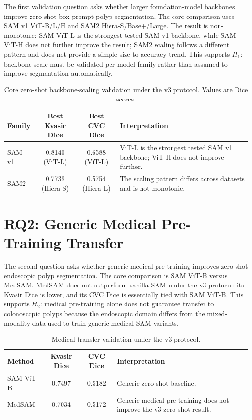 The first validation question asks whether larger foundation-model backbones improve zero-shot box-prompt polyp segmentation. The core comparison uses SAM v1 ViT-B/L/H and SAM2 Hiera-S/Base+/Large. The result is non-monotonic: SAM ViT-L is the strongest tested SAM v1 backbone, while SAM ViT-H does not further improve the result; SAM2 scaling follows a different pattern and does not provide a simple size-to-accuracy trend. This supports $H_1$: backbone scale must be validated per model family rather than assumed to improve segmentation automatically.

\begin{table}[H]
\centering
\caption{Core zero-shot backbone-scaling validation under the v3 protocol. Values are Dice scores.}
\label{tab:rq1-scaling-results}
\begin{tabular}{lccp{5.8cm}}
\toprule
\textbf{Family} & \textbf{Best Kvasir Dice} & \textbf{Best CVC Dice} & \textbf{Interpretation} \\
\midrule
SAM v1 & 0.8140 (ViT-L) & 0.6588 (ViT-L) & ViT-L is the strongest tested SAM v1 backbone; ViT-H does not improve further. \\
SAM2 & 0.7738 (Hiera-S) & 0.5754 (Hiera-L) & The scaling pattern differs across datasets and is not monotonic. \\
\bottomrule
\end{tabular}
\end{table}


\section{RQ2: Generic Medical Pre-Training Transfer}
\label{sec:rq2-results}

The second question asks whether generic medical pre-training improves zero-shot endoscopic polyp segmentation. The core comparison is SAM ViT-B versus MedSAM. MedSAM does not outperform vanilla SAM under the v3 protocol: its Kvasir Dice is lower, and its CVC Dice is essentially tied with SAM ViT-B. This supports $H_2$: medical pre-training alone does not guarantee transfer to colonoscopic polyps because the endoscopic domain differs from the mixed-modality data used to train generic medical SAM variants.

\begin{table}[H]
\centering
\caption{Medical-transfer validation under the v3 protocol.}
\label{tab:rq2-transfer-results}
\begin{tabular}{lccp{5.8cm}}
\toprule
\textbf{Method} & \textbf{Kvasir Dice} & \textbf{CVC Dice} & \textbf{Interpretation} \\
\midrule
SAM ViT-B & 0.7497 & 0.5182 & Generic zero-shot baseline. \\
MedSAM & 0.7034 & 0.5172 & Generic medical pre-training does not improve the v3 zero-shot result. \\
\bottomrule
\end{tabular}
\end{table}

